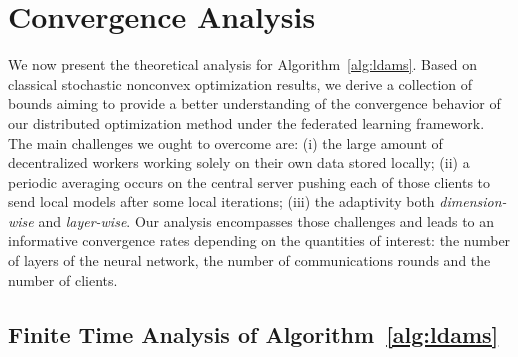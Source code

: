 \documentclass[nohyperref]{article}
\theoremstyle{plain}
\theoremstyle{definition}
\theoremstyle{remark}
\begin{document}
\vspace{-0.05in}
\section{Convergence Analysis}\label{sec:theory}

We now present the theoretical analysis for Algorithm~\ref{alg:ldams}.  
Based on classical stochastic nonconvex optimization results, we derive a collection of bounds aiming to provide a better understanding of the convergence behavior of our distributed optimization method under the federated learning framework.
The main challenges we ought to overcome are:
(i) the large amount of decentralized workers working solely on their own data stored locally; 
(ii) a periodic averaging occurs on the central server pushing each of those clients to send local models after some local iterations; 
(iii) the adaptivity both \emph{dimension-wise} and \emph{layer-wise}.
Our analysis encompasses those challenges and leads to an informative convergence rates depending on the quantities of interest: the number of layers of the neural network, the number of communications rounds and the number of clients.

\vspace{-0.05in}
\subsection{Finite Time Analysis of Algorithm~\ref{alg:ldams}}
\vspace{-0.02in}
\end{document}
